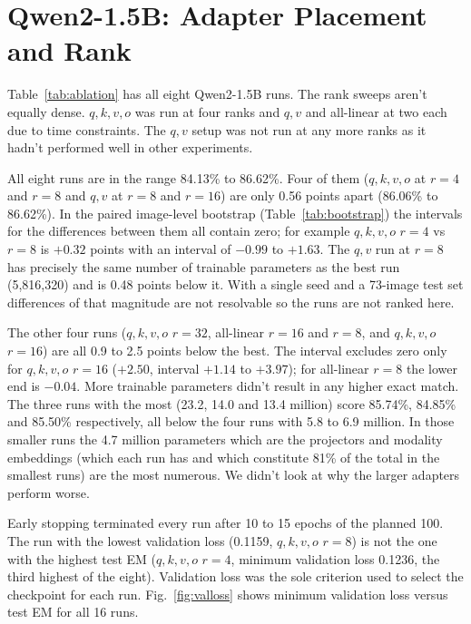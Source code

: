 \documentclass[12pt]{report}
\begin{document}
\section{Qwen2-1.5B: Adapter Placement and Rank}
\label{sec:qwen}
Table~\ref{tab:ablation} has all eight Qwen2-1.5B runs. The rank sweeps aren't equally dense. $q,k,v,o$ was run at four ranks and $q,v$ and all-linear at two each due to time constraints. The $q,v$ setup was not run at any more ranks as it hadn't performed well in other experiments.

All eight runs are in the range 84.13\% to 86.62\%. Four of them ($q,k,v,o$ at $r=4$ and $r=8$ and $q,v$ at $r=8$ and $r=16$) are only 0.56 points apart (86.06\% to 86.62\%). In the paired image-level bootstrap (Table~\ref{tab:bootstrap}) the intervals for the differences between them all contain zero; for example $q,k,v,o$ $r=4$ vs $r=8$ is $+0.32$ points with an interval of $-0.99$ to $+1.63$. The $q,v$ run at $r=8$ has precisely the same number of trainable parameters as the best run (5,816,320) and is 0.48 points below it. With a single seed and a 73-image test set differences of that magnitude are not resolvable so the runs are not ranked here.

The other four runs ($q,k,v,o$ $r=32$, all-linear $r=16$ and $r=8$, and $q,k,v,o$ $r=16$) are all 0.9 to 2.5 points below the best. The interval excludes zero only for $q,k,v,o$ $r=16$ ($+2.50$, interval $+1.14$ to $+3.97$); for all-linear $r=8$ the lower end is $-0.04$. More trainable parameters didn't result in any higher exact match. The three runs with the most (23.2, 14.0 and 13.4 million) score 85.74\%, 84.85\% and 85.50\% respectively, all below the four runs with 5.8 to 6.9 million. In those smaller runs the 4.7 million parameters which are the projectors and modality embeddings (which each run has and which constitute 81\% of the total in the smallest runs) are the most numerous. We didn't look at why the larger adapters perform worse.

Early stopping terminated every run after 10 to 15 epochs of the planned 100. The run with the lowest validation loss (0.1159, $q,k,v,o$ $r=8$) is not the one with the highest test EM ($q,k,v,o$ $r=4$, minimum validation loss 0.1236, the third highest of the eight). Validation loss was the sole criterion used to select the checkpoint for each run. Fig.~\ref{fig:valloss} shows minimum validation loss versus test EM for all 16 runs.
\end{document}
